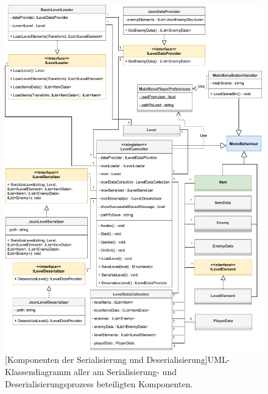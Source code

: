 \begin{figure}
	\centering
	\includegraphics[width=1.00\linewidth]{diagrams/Level_Serialization_Deserialization_reduced.pdf}
	[Komponenten der Serialisierung und Deserialisierung]{UML-Klassendiagramm aller am Serialisierung- und Deserialisierungsprozess beteiligten Komponenten.}
	\label{fig:serialization_diagram}
	\end{figure}


